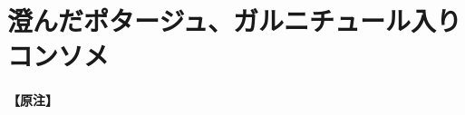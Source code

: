 \href{スミ、原稿下準備\%20amanojack0615-20180510}{}
\href{未、原文対照チェック}{} \href{未、日本語表現校正}{}
\href{未、その他修正}{} \href{未、原稿最終校正}{}

\hypertarget{potages-claires-et-consommes-garnis}{%
\section{澄んだポタージュ、ガルニチュール入りコンソメ}\label{potages-claires-et-consommes-garnis}}



\hypertarget{nota-potages-claires-et-consommes-garnis}{%
\paragraph{【原注】}\label{nota-potages-claires-et-consommes-garnis}}

